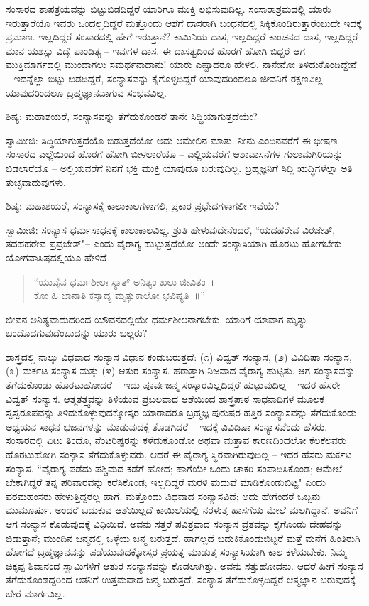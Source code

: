 ಸಂಸಾರದ ತಾಪತ್ರಯವನ್ನು ಬಿಟ್ಟುಬಿಡದಿದ್ದರೆ ಯಾರಿಗೂ ಮುಕ್ತಿ ಲಭಿಸುವುದಿಲ್ಲ. ಸಂಸಾರಾಶ್ರಮದಲ್ಲಿ ಯಾರು ಇರುತ್ತಾರೆಯೊ ಇವರು ಒಂದಲ್ಲದಿದ್ದರೆ ಮತ್ತೊಂದು ಆಶೆಗೆ ದಾಸರಾಗಿ ಬಂಧನದಲ್ಲಿ ಸಿಕ್ಕಿಕೊಂಡಿರುತ್ತಾರೆಂಬುದೇ ಇದಕ್ಕೆ ಪ್ರಮಾಣ. ಇಲ್ಲದಿದ್ದರೆ ಸಂಸಾರದಲ್ಲಿ ಹೇಗೆ ಇರುತ್ತಾನೆ? ಕಾಮಿನಿಯ ದಾಸ, ಇಲ್ಲದಿದ್ದರೆ ಕಾಂಚನದ ದಾಸ, ಇಲ್ಲದಿದ್ದರೆ ಮಾನ ಯಶಸ್ಸು ವಿದ್ಯೆ ಪಾಂಡಿತ್ಯ – ಇವುಗಳ ದಾಸ. ಈ ದಾಸತ್ವದಿಂದ ಹೊರಗೆ ಹೋಗಿ ಬಿದ್ದರೆ ಆಗ ಮುಕ್ತಿಮಾರ್ಗದಲ್ಲಿ ಮುಂದಾಗಲು ಸಮರ್ಥನಾದಾನು! ಯಾರು ಎಷ್ಟಾದರೂ ಹೇಳಲಿ, ನಾನೇನೋ ತಿಳಿದುಕೊಂಡಿದ್ದೇನೆ – ಇದನ್ನೆಲ್ಲಾ ಬಿಟ್ಟು ಬಿಡದಿದ್ದರೆ, ಸಂನ್ಯಾಸವನ್ನು ಕೈಗೊಳ್ಳದಿದ್ದರೆ ಯಾವುದರಿಂದಲೂ ಜೀವನಿಗೆ ರಕ್ಷಣವಿಲ್ಲ – ಯಾವುದರಿಂದಲೂ ಬ್ರಹ್ಮಜ್ಞಾನವಾಗುವ ಸಂಭವವಿಲ್ಲ.

ಶಿಷ್ಯ: ಮಹಾಶಯರೆ, ಸಂನ್ಯಾಸವನ್ನು ತೆಗೆದುಕೊಂಡರೆ ತಾನೇ ಸಿದ್ಧಿಯಾಗುತ್ತದೆಯೇ?

ಸ್ವಾಮೀಜಿ: ಸಿದ್ಧಿಯಾಗುತ್ತದೆಯೊ ಬಿಡುತ್ತದೆಯೋ ಅದು ಆಮೇಲಿನ ಮಾತು. ನೀನು ಎಂದಿನವರೆಗೆ ಈ ಭೀಷಣ ಸಂಸಾರದ ಎಲ್ಲೆಯಿಂದ ಹೊರಗೆ ಹೋಗಿ ಬೀಳಲಾರೆಯೊ – ಎಲ್ಲಿಯವರೆಗೆ ಆಶಾವಾಸನೆಗಳ ಗುಲಾಮಗಿರಿಯನ್ನು ಬಿಡಲಾರೆಯೊ – ಅಲ್ಲಿಯವರೆಗೆ ನಿನಗೆ ಭಕ್ತಿ ಮುಕ್ತಿ ಯಾವುದೂ ಬರುವುದಿಲ್ಲ. ಬ್ರಹ್ಮಜ್ಞನಿಗೆ ಸಿದ್ಧಿ ಋದ್ಧಿಗಳೆಲ್ಲಾ ಅತಿ ತುಚ್ಛವಾದುವುಗಳು.

ಶಿಷ್ಯ: ಮಹಾಶಯರೆ, ಸಂನ್ಯಾಸಕ್ಕೆ ಕಾಲಾಕಾಲಗಳಾಗಲಿ, ಪ್ರಕಾರ ಪ್ರಭೇದಗಳಾಗಲೀ ಇವೆಯೆ?

ಸ್ವಾಮೀಜಿ: ಸಂನ್ಯಾಸ ಧರ್ಮಸಾಧನಕ್ಕೆ ಕಾಲಾಕಾಲವಿಲ್ಲ. ಶ್ರುತಿ ಹೇಳುವುದೇನೆಂದರೆ, “ಯದಹರೇವ ವಿರಜೇತ್, ತದಹಹರೇವ ಪ್ರವ್ರಜೇತ್"– ಎಂದು ವೈರಾಗ್ಯ ಹುಟ್ಟುತ್ತದೆಯೋ ಅಂದೇ ಸಂನ್ಯಾಸಿಯಾಗಿ ಹೊರಟು ಹೋಗಬೇಕು. ಯೋಗವಾಸಿಷ್ಠದಲ್ಲಿಯೂ ಹೇಳಿದೆ –

\begin{verse}
“ಯುವೈವ ಧರ್ಮಶೀಲಃ ಸ್ಯಾತ್ ಅನಿತ್ಯಂ ಖಲು ಜೀವಿತಂ~।\\ಕೋ ಹಿ ಜಾನಾತಿ ಕಸ್ಯಾದ್ಯ ಮೃತ್ಯುಕಾಲೋ ಭವಿಷ್ಯತಿ~॥”
\end{verse}

ಜೀವನ ಅನಿತ್ಯವಾದುದರಿಂದ ಯೌವನದಲ್ಲಿಯೇ ಧರ್ಮಶೀಲನಾಗಬೇಕು. ಯಾರಿಗೆ ಯಾವಾಗ ಮೃತ್ಯು ಬಂದೊದಗುವುದೆಂಬುದನ್ನು ಯಾರು ಬಲ್ಲರು?

ಶಾಸ್ತ್ರದಲ್ಲಿ ನಾಲ್ಕು ವಿಧವಾದ ಸಂನ್ಯಾಸ ವಿಧಾನ ಕಂಡುಬರುತ್ತದೆ: (೧) ವಿದ್ವತ್ ಸಂನ್ಯಾಸ, (೨) ವಿವಿದಿಷಾ ಸಂನ್ಯಾಸ, (೩) ಮರ್ಕಟ ಸಂನ್ಯಾಸ ಮತ್ತು (೪) ಆತುರ ಸಂನ್ಯಾಸ. ಹಠಾತ್ತಾಗಿ ನಿಜವಾದ ವೈರಾಗ್ಯ ಹುಟ್ಟಿತು. ಆಗ ಸಂನ್ಯಾಸವನ್ನು ತೆಗೆದುಕೊಂಡು ಹೊರಟುಹೋದರೆ – ಇದು ಪೂರ್ವಜನ್ಮ ಸಂಸ್ಕಾರವಿಲ್ಲದಿದ್ದರೆ ಹುಟ್ಟುವುದಿಲ್ಲ – ಇದರ ಹೆಸರೇ ವಿದ್ವತ್ ಸಂನ್ಯಾಸ. ಆತ್ಮತತ್ತ್ವವನ್ನು ತಿಳಿಯುವ ಪ್ರಬಲವಾದ ಆಶೆಯಿಂದ ಶಾಸ್ತ್ರಪಾಠ ಸಾಧನಾದಿಗಳ ಮೂಲಕ ಸ್ವಸ್ವರೂಪವನ್ನು ತಿಳಿದುಕೊಳ್ಳುವುದಕ್ಕೋಸ್ಕರ ಯಾರಾದರೂ ಬ್ರಹ್ಮಜ್ಞ ಪುರುಷರ ಹತ್ತಿರ ಸಂನ್ಯಾಸವನ್ನು ತೆಗೆದುಕೊಂಡು ಅಧ್ಯಯನ ಸಾಧನ ಭಜನಗಳನ್ನು ಮಾಡುವುದಕ್ಕೆ ತೊಡಗಿದರೆ – ಇದಕ್ಕೆ ವಿವಿದಿಷಾ ಸಂನ್ಯಾಸವೆಂದು ಹೆಸರು. ಸಂಸಾರದಲ್ಲಿ ಏಟು ತಿಂದೊ, ನೆಂಟರಿಷ್ಟರನ್ನು ಕಳೆದುಕೊಂಡೋ ಅಥವಾ ಮತ್ತಾವ ಕಾರಣದಿಂದಲೋ ಕೆಲಕೆಲವರು ಹೊರಟುಹೋಗಿ ಸಂನ್ಯಾಸ ತೆಗೆದುಕೊಳ್ಳುವರು. ಆದರೆ ಈ ವೈರಾಗ್ಯ ಸ್ಥಿರವಾಗಿರುವುದಿಲ್ಲ – ಇದರ ಹೆಸರು ಮರ್ಕಟ ಸಂನ್ಯಾಸ. “ವೈರಾಗ್ಯ ಪಡೆದು ಪಶ್ಚಿಮದ ಕಡೆಗೆ ಹೋದ; ಹಾಗೆಯೇ ಒಂದು ಚಾಕರಿ ಸಂಪಾದಿಸಿಕೊಂಡ; ಆಮೇಲೆ ಬೇಕಾಗಿದ್ದರೆ ತನ್ನ ಪರಿವಾರವನ್ನು ಕರೆಸಿಕೊಂಡ; ಇಲ್ಲದಿದ್ದರೆ ಮರಳಿ ಮದುವೆ ಮಾಡಿಕೊಂಡುಬಿಟ್ಟ" ಎಂದು ಪರಮಹಂಸರು ಹೇಳುತ್ತಿದ್ದರಲ್ಲ ಹಾಗೆ. ಮತ್ತೊಂದು ವಿಧವಾದ ಸಂನ್ಯಾಸವಿದೆ; ಅದು ಹೇಗೆಂದರೆ ಒಬ್ಬನು ಮುಮೂರ್ಷು. ಅಂದರೆ ಬದುಕುವ ಆಶೆಯಿಲ್ಲದೆ ಕಾಯಿಲೆಯಲ್ಲಿ ನರಳುತ್ತ ಹಾಸಗೆಯ ಮೇಲೆ ಮಲಗಿದ್ದಾನೆ. ಅವನಿಗೆ ಆಗ ಸಂನ್ಯಾಸ ಕೊಡುವುದಕ್ಕೆ ವಿಧಿಯಿದೆ. ಅವನು ಸತ್ತರೆ ಪವಿತ್ರವಾದ ಸಂನ್ಯಾಸ ವ್ರತವನ್ನು ಕೈಗೊಂಡು ದೇಹವನ್ನು ಬಿಡುತ್ತಾನೆ; ಮುಂದಿನ ಜನ್ಮದಲ್ಲಿ ಒಳ್ಳೆಯ ಜನ್ಮ ಬರುತ್ತದೆ. ಹಾಗಲ್ಲದೆ ಬದುಕಿಕೊಂಡುಬಿಟ್ಟರೆ ಮತ್ತೆ ಮನೆಗೆ ಹಿಂತಿರುಗಿ ಹೋಗದೆ ಬ್ರಹ್ಮಜ್ಞಾನವನ್ನು ಪಡೆಯುವುದಕ್ಕೋಸ್ಕರ ಪ್ರಯತ್ನ ಮಾಡುತ್ತ ಸಂನ್ಯಾಸಿಯಾಗಿ ಕಾಲ ಕಳೆಯಬೇಕು. ನಿಮ್ಮ ಚಿಕ್ಕಪ್ಪ ಶಿವಾನಂದ ಸ್ವಾಮಿಗಳಿಗೆ ಆತುರ ಸಂನ್ಯಾಸವನ್ನು ಕೊಡಲಾಗಿತ್ತು. ಅವನು ಸತ್ತುಹೋದನು. ಆದರೆ ಹೀಗೆ ಸಂನ್ಯಾಸ ತೆಗೆದುಕೊಂಡದ್ದರಿಂದ ಆತನಿಗೆ ಉತ್ತಮವಾದ ಜನ್ಮ ಬರುತ್ತದೆ. ಸಂನ್ಯಾಸ ತೆಗೆದುಕೊಳ್ಳದಿದ್ದರೆ ಆತ್ಮಜ್ಞಾನ ಬರುವುದಕ್ಕೆ ಬೇರೆ ಮಾರ್ಗವಿಲ್ಲ.

